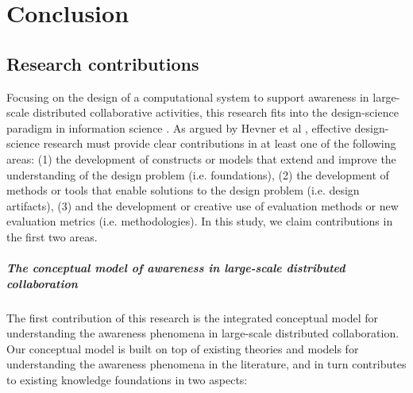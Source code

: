 \graphicspath{{Figures/}}

\chapter{Conclusion} %
\label{cha:conclusion}
\section{Research contributions} %
\label{sec:contributions}
Focusing on the design of a computational system to support awareness in large-scale distributed collaborative activities, this research fits into the design-science paradigm in information science \cite{Hevner2004}. As argued by Hevner et al \cite{Hevner2004}, effective design-science research must provide clear contributions in at least one of the following areas: (1) the development of constructs or models that extend and improve the understanding of the design problem (i.e. foundations), (2) the development of methods or tools that enable solutions to the design problem (i.e. design artifacts), (3) and the development or creative use of evaluation methods or new evaluation metrics (i.e. methodologies). In this study, we claim contributions in the first two areas. 

\paragraph*{The conceptual model of awareness in large-scale distributed collaboration} %
\label{par:a_conceptual_model_of_awareness_in_complex_collaborations}
The first contribution of this research is the integrated conceptual model for understanding the awareness phenomena in large-scale distributed collaboration. Our conceptual model is built on top of existing theories and models for understanding the awareness phenomena in the literature, and in turn contributes to existing knowledge foundations in two aspects:

